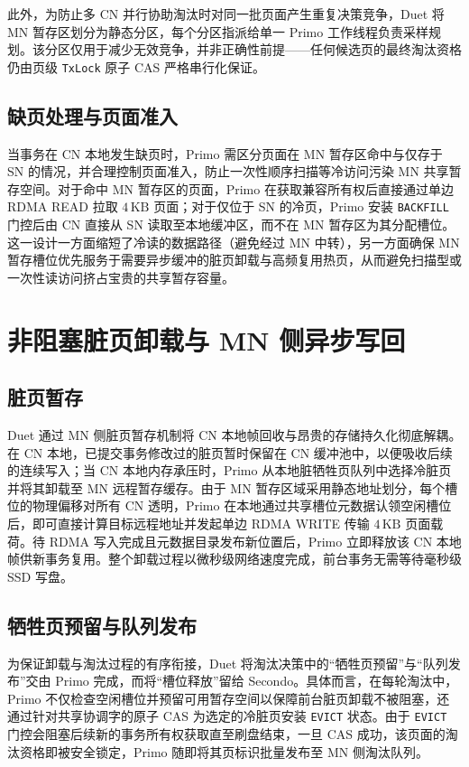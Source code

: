 此外，为防止多 CN 并行协助淘汰时对同一批页面产生重复决策竞争，Duet 将 MN 暂存区划分为静态分区，每个分区指派给单一 Primo 工作线程负责采样规划。该分区仅用于减少无效竞争，并非正确性前提——任何候选页的最终淘汰资格仍由页级 \texttt{TxLock} 原子 CAS 严格串行化保证。

\subsection{缺页处理与页面准入}
当事务在 CN 本地发生缺页时，Primo 需区分页面在 MN 暂存区命中与仅存于 SN 的情况，并合理控制页面准入，防止一次性顺序扫描等冷访问污染 MN 共享暂存空间\cite{weinerTmo2022}。对于命中 MN 暂存区的页面，Primo 在获取兼容所有权后直接通过单边 RDMA READ 拉取 $4\,\text{KB}$ 页面；对于仅位于 SN 的冷页，Primo 安装 \texttt{BACKFILL} 门控后由 CN 直接从 SN 读取至本地缓冲区，而不在 MN 暂存区为其分配槽位。这一设计一方面缩短了冷读的数据路径（避免经过 MN 中转），另一方面确保 MN 暂存槽位优先服务于需要异步缓冲的脏页卸载与高频复用热页，从而避免扫描型或一次性读访问挤占宝贵的共享暂存容量。

\section{非阻塞脏页卸载与 MN 侧异步写回\label{sec:duet.mn}}

\subsection{脏页暂存}
Duet 通过 MN 侧脏页暂存机制将 CN 本地帧回收与昂贵的存储持久化彻底解耦\cite{ruanPersistent2023}。在 CN 本地，已提交事务修改过的脏页暂时保留在 CN 缓冲池中，以便吸收后续的连续写入；当 CN 本地内存承压时，Primo 从本地脏牺牲页队列中选择冷脏页并将其卸载至 MN 远程暂存缓存。由于 MN 暂存区域采用静态地址划分，每个槽位的物理偏移对所有 CN 透明，Primo 在本地通过共享槽位元数据认领空闲槽位后，即可直接计算目标远程地址并发起单边 RDMA WRITE 传输 $4\,\text{KB}$ 页面载荷。待 RDMA 写入完成且元数据目录发布新位置后，Primo 立即释放该 CN 本地帧供新事务复用。整个卸载过程以微秒级网络速度完成，前台事务无需等待毫秒级 SSD 写盘。

\subsection{牺牲页预留与队列发布}
为保证卸载与淘汰过程的有序衔接，Duet 将淘汰决策中的“牺牲页预留”与“队列发布”交由 Primo 完成，而将“槽位释放”留给 Secondo\cite{zhangTowards2021}。具体而言，在每轮淘汰中，Primo 不仅检查空闲槽位并预留可用暂存空间以保障前台脏页卸载不被阻塞，还通过针对共享协调字的原子 CAS 为选定的冷脏页安装 \texttt{EVICT} 状态。由于 \texttt{EVICT} 门控会阻塞后续新的事务所有权获取直至刷盘结束，一旦 CAS 成功，该页面的淘汰资格即被安全锁定，Primo 随即将其页标识批量发布至 MN 侧淘汰队列。

